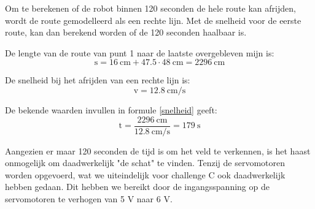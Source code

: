 \documentclass{report}
\begin{document}
Om te berekenen of de robot binnen 120 seconden de hele route kan afrijden, wordt de route gemodelleerd als een rechte lijn. Met de snelheid voor de eerste route, kan dan berekend worden of de 120 seconden haalbaar is.

De lengte van de route van punt 1 naar de laatste overgebleven mijn is:
$$\mathrm{s}=16\:\mathrm{cm}+47.5\cdot48\:\mathrm{cm}=2296\:\mathrm{cm}$$

De snelheid bij het afrijden van een rechte lijn is:
$$\mathrm{v}=12.8\:\mathrm{cm/s}$$

De bekende waarden invullen in formule \ref{snelheid} geeft:
$$\mathrm{t}=\frac{2296\:\mathrm{cm}}{12.8\:\mathrm{cm/s}}=179\:\mathrm{s}$$

Aangezien er maar 120 seconden de tijd is om het veld te verkennen, is het haast onmogelijk om daadwerkelijk "de schat" te vinden. Tenzij de servomotoren worden opgevoerd, wat we uiteindelijk voor challenge C ook daadwerkelijk hebben gedaan. Dit hebben we bereikt door de ingangsspanning op de servomotoren te verhogen van 5 V naar 6 V.
\end{document}
